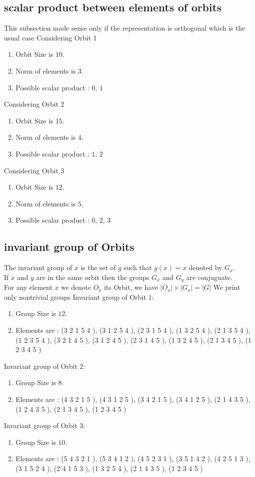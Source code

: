 \documentclass[12pt]{article}
\begin{document}
\subsection{scalar product between elements of orbits}
\noindent This subsection made sense only if the representation is orthogonal which is the usual case
Considering Orbit 1
\begin{enumerate}
\item Orbit Size is $10$.
\item Norm of elements is $3$.
\item Possible scalar product : $0$, $1$
\end{enumerate}
Considering Orbit 2
\begin{enumerate}
\item Orbit Size is $15$.
\item Norm of elements is $4$.
\item Possible scalar product : $1$, $2$
\end{enumerate}
Considering Orbit 3
\begin{enumerate}
\item Orbit Size is $12$.
\item Norm of elements is $5$.
\item Possible scalar product : $0$, $2$, $3$
\end{enumerate}
\subsection{invariant group of Orbits}
\noindent The invariant group of $x$ is the set of $g$ such that $g(x)=x$ denoted by $G_x$.\\
If $x$ and $y$ are in the same orbit then the groups $G_x$ and  $G_y$ are conjuguate.\\
For any element $x$ we denote $O_x$ its Orbit, we have $|O_x|\times |G_x|=|G|$
We print only nontrivial groups
Invariant group of Orbit $1$:
\begin{enumerate}
\item Group Size is $12$.
\item Elements are : (3 2 1 5 4  ), (3 1 2 5 4  ), (2 3 1 5 4  ), (1 3 2 5 4  ), (2 1 3 5 4  ), (1 2 3 5 4  ), (3 2 1 4 5  ), (3 1 2 4 5  ), (2 3 1 4 5  ), (1 3 2 4 5  ), (2 1 3 4 5  ), (1 2 3 4 5  )
\end{enumerate}
Invariant group of Orbit $2$:
\begin{enumerate}
\item Group Size is $8$.
\item Elements are : (4 3 2 1 5  ), (4 3 1 2 5  ), (3 4 2 1 5  ), (3 4 1 2 5  ), (2 1 4 3 5  ), (1 2 4 3 5  ), (2 1 3 4 5  ), (1 2 3 4 5  )
\end{enumerate}
Invariant group of Orbit $3$:
\begin{enumerate}
\item Group Size is $10$.
\item Elements are : (5 4 3 2 1  ), (5 3 4 1 2  ), (4 5 2 3 1  ), (3 5 1 4 2  ), (4 2 5 1 3  ), (3 1 5 2 4  ), (2 4 1 5 3  ), (1 3 2 5 4  ), (2 1 4 3 5  ), (1 2 3 4 5  )
\end{enumerate}
\end{document}
